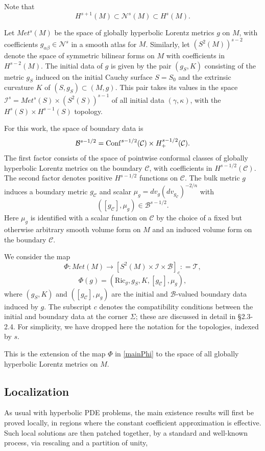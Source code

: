 \documentclass[10pt]{amsart}
\renewcommand{\a}{\alpha}
\renewcommand{\b}{\beta}
\newcommand{\g}{\gamma}
\newcommand{\Si}{\Sigma}
\renewcommand{\k}{\kappa}
\newcommand{\cC}{{\mathcal C}}
\newcommand{\cT}{{\mathcal T}}
\newcommand{\cB}{{\mathcal B}}
\newcommand{\cN}{{\mathcal N}}
\newcommand{\cI}{\mathcal I}
\newcommand{\Ric}{\mathrm{Ric}}
\newcommand{\be}{\begin{equation}}
\newcommand{\ee}{\end{equation}}
\renewcommand{\to}{\rightarrow}
\newcommand{\<}{\langle}
\renewcommand{\>}{\rangle}
\theoremstyle{plain}
\theoremstyle{remark}
\theoremstyle{definition}
\numberwithin{equation}{section}
\begin{document}
  Note that 
$$H^{s+1}(M) \subset \cN^s(M) \subset H^s(M).$$

 Let $Met^s(M)$ be the space of globally hyperbolic Lorentz metrics $g$ on $M$, with coefficients $g_{\a\b} \in \cN^s$ in a smooth atlas for $M$. 
Similarly, let $(S^2(M))^{s-2}$ denote the space of symmetric bilinear forms on $M$ with coefficients in $H^{s-2}(M)$. 
 The initial data of $g$ is given by the pair $(g_S, K)$ consisting of the metric $g_S$ induced on the initial Cauchy surface $S = S_0$ and the 
 extrinsic curvature $K$ of $(S, g_S) \subset (M, g)$. This pair takes its values in the space $\cI^s = Met^s(S)\times (S^2(S))^{s-1}$ of all 
 initial data $(\g, \k)$, with the $H^s(S) \times H^{s-1}(S)$ topology.  
 
   For this work, the space of boundary data is 
 $$\cB^{s-1/2} = {\rm Conf}^{s-1/2}(\cC)\times H_+^{s-1/2}(\cC).$$
 The first factor consists of the space of pointwise conformal classes of globally hyperbolic Lorentz metrics on the boundary $\cC$, with 
 coefficients in $H^{s-1/2}(\cC)$. The second factor denotes positive $H^{s-1/2}$ functions on $\cC$. The bulk metric $g$ induces a 
 boundary metric $g_{\cC}$ and scalar $\mu_g = dv_g(dv_{g_{\cC}})^{-2/n}$ with 
 $$([g_{\cC}], \mu_g) \in \cB^{s-1/2}.$$ 
 Here $\mu_g$ is identified with a scalar function on $\cC$ by the choice of a fixed but otherwise arbitrary smooth volume form on $M$ and an 
 induced volume form on the boundary $\cC$. 

  We consider the map 
\be \label{Phi}
\Phi: Met(M) \to [S^2(M) \times \cI \times \cB]_c : = \cT,
\ee
$$\Phi(g) = (\Ric_g, g_S, K, [g_{\cC}], \mu_g),$$
where $(g_S, K)$ and $([g_{\cC}], \mu_g)$ are the initial and $\cB$-valued boundary data induced by $g$. The subscript $c$ denotes the compatibility 
conditions between the initial and boundary data at the corner $\Si$; these are discussed in detail in \S 2.3-2.4. For simplicity, we have dropped 
here the notation for the topologies, indexed by $s$. 

This is the extension of the map $\Phi$ in \eqref{mainPhi} to the space of all globally hyperbolic Lorentz metrics on $M$. 
 

 \subsection{Localization} 
  
   As usual with hyperbolic PDE problems, the main existence results will first be proved locally, in regions where the constant coefficient 
approximation is effective. Such local solutions are then patched together, by a standard and well-known process, via rescaling and a 
partition of unity, 
\end{document}
